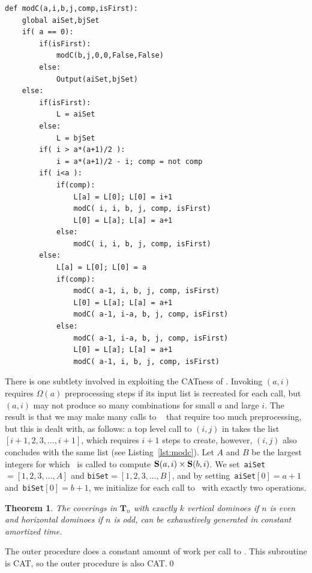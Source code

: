 \documentclass[12pt]{amsart}
\newtheorem{theorem}{Theorem}
\newcommand{\lstref}[1]{Listing~\ref{lst:#1}}
\newcommand{\Tn}[1]{\mathbf T_{#1}}
\begin{document}
\begin{lstlisting}[float,caption = {Python code for a modified version
of \cc~from \cite{BaronaigienRuskey1993} to compute $\Sset(a,i)\times
\Sset(b,j)$.  Global variables \texttt{aiSet} and \texttt{bjSet} are
the lists representing $\Sset(a,i)$ and $\Sset(b,i)$, respectively},
label={lst:modc}]
def modC(a,i,b,j,comp,isFirst):
    global aiSet,bjSet
    if( a == 0):
        if(isFirst):
            modC(b,j,0,0,False,False)
        else:
            Output(aiSet,bjSet)
    else:
        if(isFirst):
            L = aiSet
        else:
            L = bjSet
        if( i > a*(a+1)/2 ):
            i = a*(a+1)/2 - i; comp = not comp
        if( i<a ):
            if(comp):
                L[a] = L[0]; L[0] = i+1
                modC( i, i, b, j, comp, isFirst)
                L[0] = L[a]; L[a] = a+1
            else:
                modC( i, i, b, j, comp, isFirst)
        else:
            L[a] = L[0]; L[0] = a
            if(comp):
                modC( a-1, i, b, j, comp, isFirst)
                L[0] = L[a]; L[a] = a+1
                modC( a-1, i-a, b, j, comp, isFirst)
            else:
                modC( a-1, i-a, b, j, comp, isFirst)
                L[0] = L[a]; L[a] = a+1
                modC( a-1, i, b, j, comp, isFirst)
\end{lstlisting}

There is one subtlety involved in exploiting the CATness of \cc.
Invoking \cc$(a,i)$ requires $\Omega(a)$ preprocessing steps if its
input list is recreated for each call, but \cc$(a,i)$ may not produce
so many combinations for small $a$ and large $i$.  The result is that
we may make many calls to \modcc~ that require too much preprocessing,
but this is dealt with, as follows: a top level call to \cc$(i,j)$ in
\cite{BaronaigienRuskey1993} takes the list $[i+1,2,3,\ldots, i+1]$,
which requires $i+1$ steps to create, however, \cc$(i,j)$ also
concludes with the same list (see \lstref{modc}).  Let $A$ and $B$ be
the largest integers for which \modcc~is called to compute $\mathbf S(a,i)
\times \mathbf S(b,i)$.  We set~\texttt{aiSet}$ = [1,2,3,\ldots, A]$ and
\texttt{biSet}$ = [1,2,3,\ldots, B]$, and by
setting~\texttt{aiSet}$[0]=a+1$ and~\texttt{biSet}$[0]=b+1$, we
initialize for each call to \modcc~with exactly two operations.

\begin{theorem}
  \label{thm:cattnk}
  The coverings in $\Tn{n}$ with exactly $k$ vertical dominoes if $n$ is
  even and horizontal dominoes if $n$ is odd, can be exhaustively
  generated in constant amortized time.
\end{theorem}
\proof The outer procedure does a constant amount of work per call to
\modcc.  This subroutine is CAT, so the outer procedure is also
CAT.\qed
\end{document}
